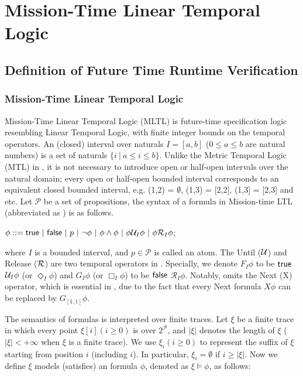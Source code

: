 \chapter{Mission-Time Linear Temporal Logic}

\section{Definition of Future Time Runtime Verification}


\subsection{Mission-Time Linear Temporal Logic} Mission-Time Linear Temporal Logic (MLTL) \cite{r2u2} is future-time specification logic resembling Linear Temporal Logic, with finite integer bounds on the temporal operators.
An (closed) interval over naturals $I = [a, b]$ ($0\leq a\leq b$ are natural numbers) is a set of naturals
$\{i\ |\ a\leq i\leq b\}$.
Unlike the Metric Temporal Logic (\textsf{MTL}) in \cite{AH94a}, it is not necessary to introduce open or half-open intervals over the natural domain; every open or half-open bounded interval corresponds to an equivalent closed bounded interval, e.g. (1,2) = $\emptyset$, (1,3) = [2,2], (1,3] = [2,3] and etc. Let $\mathcal{P}$ be a set of propositions, the syntax of a formula in Mission-time LTL (abbreviated as \mltl) is as follows.
\begin{center}
   	$\phi ::= \tt\ |\ \ff\ |\ p\ |\ \neg\phi\ |\ \phi\wedge\phi\ |\ \phi \U_I\phi\ |\ \phi \R_I\phi$;
\end{center}
%
where $I$ is a bounded interval, and $p\in\mathcal{P}$ is called an atom.
The Until ($\U$) and Release ($\R$) are two temporal operators in \mltl.
Specially, we denote $F_I\phi$ to be $\tt$ $\U_I \phi$ (or $\Diamond_I \phi$) and $G_I\phi$ (or $\Box_I \phi$) to be $\ff$ $\mathcal{R}_I\phi$.
Notably, \mltl omits the Next (X) operator, which is essential in \ltl, due to the fact that
every Next formula $X\phi$ can be replaced by $G_{[1,1]}\phi$.

The semantics of \mltl formulas is interpreted over finite traces.
Let $\xi$ be a finite trace in which every point $\xi[i] (i\geq 0)$ is over $2^{\mathcal{P}}$, and $|\xi|$ denotes the length of
$\xi$ ($|\xi|<+\infty$ when
$\xi$ is a finite trace).
We use $\xi_i (i\geq 0)$ to represent the suffix of $\xi$ starting from position $i$ (including $i$). In particular, $\xi_i = \emptyset$ if $i\geq |\xi|$.
Now we define $\xi$ models (satisfies) an \mltl formula $\phi$, denoted as $\xi\models \phi$, as follows:

